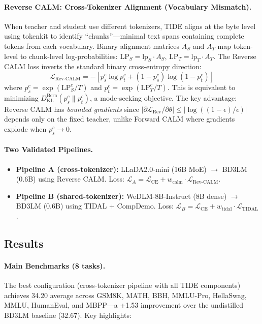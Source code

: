 \documentclass[11pt]{article}
\begin{document}
\paragraph{Reverse CALM: Cross-Tokenizer Alignment (Vocabulary Mismatch).}
When teacher and student use different tokenizers, TIDE aligns at the byte level using tokenkit to identify ``chunks''---minimal text spans containing complete tokens from each vocabulary. Binary alignment matrices $A_S$ and $A_T$ map token-level to chunk-level log-probabilities: $\mathrm{LP}_S = \mathrm{lp}_S \cdot A_S$, $\mathrm{LP}_T = \mathrm{lp}_T \cdot A_T$. The Reverse CALM loss inverts the standard binary cross-entropy direction:
\begin{equation}
    \mathcal{L}_{\mathrm{Rev\text{-}CALM}} = -\!\left[p_s^c \log p_t^c + (1 - p_s^c) \log(1 - p_t^c)\right]
\end{equation}
where $p_s^c = \exp(\mathrm{LP}_S^c / T)$ and $p_t^c = \exp(\mathrm{LP}_T^c / T)$. This is equivalent to minimizing $D_{\mathrm{KL}}^{\mathrm{Bern}}(p_s^c \| p_t^c)$, a mode-seeking objective. The key advantage: Reverse CALM has \emph{bounded gradients} since $|\partial \mathcal{L}_{\mathrm{Rev}} / \partial \theta| \leq |\log((1-\epsilon)/\epsilon)|$ depends only on the fixed teacher, unlike Forward CALM where gradients explode when $p_s^c \to 0$.

\paragraph{Two Validated Pipelines.}
\begin{itemize}
    \item \textbf{Pipeline A (cross-tokenizer):} LLaDA2.0-mini (16B MoE) $\to$ BD3LM (0.6B) using Reverse CALM. Loss: $\mathcal{L}_A = \mathcal{L}_{\mathrm{CE}} + w_{\mathrm{calm}} \cdot \mathcal{L}_{\mathrm{Rev\text{-}CALM}}$.
    \item \textbf{Pipeline B (shared-tokenizer):} WeDLM-8B-Instruct (8B dense) $\to$ BD3LM (0.6B) using TIDAL + CompDemo. Loss: $\mathcal{L}_B = \mathcal{L}_{\mathrm{CE}} + w_{\mathrm{tidal}} \cdot \mathcal{L}_{\mathrm{TIDAL}}$.
\end{itemize}

\subsection{Results}

\paragraph{Main Benchmarks (8 tasks).}
The best configuration (cross-tokenizer pipeline with all TIDE components) achieves 34.20 average across GSM8K, MATH, BBH, MMLU-Pro, HellaSwag, MMLU, HumanEval, and MBPP---a +1.53 improvement over the undistilled BD3LM baseline (32.67). Key highlights:
\end{document}

